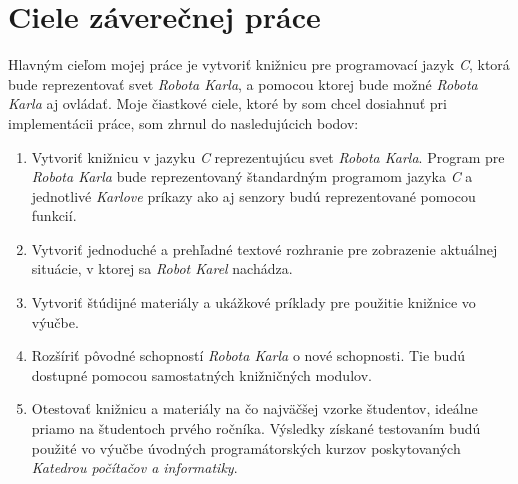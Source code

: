 
\chapter{Ciele záverečnej práce}\label{ch:goals}

Hlavným cieľom mojej práce je vytvoriť knižnicu pre programovací jazyk \emph{C}, ktorá bude reprezentovať svet \emph{Robota Karla}, a pomocou ktorej bude možné \emph{Robota Karla} aj ovládať. Moje čiastkové ciele, ktoré by som chcel dosiahnuť pri implementácii práce, som zhrnul do nasledujúcich bodov:

\begin{enumerate}
    \item Vytvoriť knižnicu v jazyku \emph{C} reprezentujúcu svet \emph{Robota Karla}. Program pre \emph{Robota Karla} bude reprezentovaný štandardným programom jazyka \emph{C} a jednotlivé \emph{Karlove} príkazy ako aj senzory budú reprezentované pomocou funkcií.

    \item Vytvoriť jednoduché a prehľadné textové rozhranie pre zobrazenie aktuálnej situácie, v ktorej sa \emph{Robot Karel} nachádza.

    \item Vytvoriť štúdijné materiály a ukážkové príklady pre použitie knižnice vo výučbe.

    \item Rozšíriť pôvodné schopností \emph{Robota Karla} o nové schopnosti. Tie budú dostupné pomocou samostatných knižničných modulov.

    \item Otestovať knižnicu a materiály na čo najväčšej vzorke študentov, ideálne priamo na študentoch prvého ročníka. Výsledky získané testovaním budú použité vo výučbe úvodných programátorských kurzov poskytovaných \emph{Katedrou počítačov a informatiky}.
\end{enumerate}

